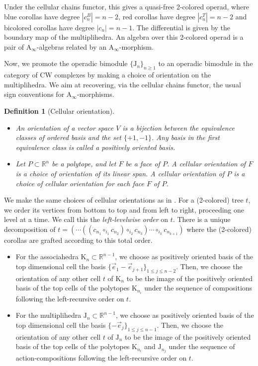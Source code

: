 \documentclass[twoside, 12pt]{amsart}
\newtheorem{definition}{Definition}[section]
\theoremstyle{remark}
\newcommand{\RR}{\mathbb{R}}
\newcommand{\K}{\mathrm{K}}
\newcommand{\J}{\mathrm{J}}
\begin{document}
Under the cellular chains functor, this gives a quasi-free 2-colored operad, where blue corollas have degree $|c_n^B|=n-2$, red corollas have degree $|c_n^T|=n-2$ and bicolored corollas have degree $|c_n|=n-1$. The differential is given by the boundary map of the multiplihedra. An algebra over this 2-colored operad is a pair of $\mathrm{A}_\infty$-algebras related by an $\mathrm{A}_\infty$-morphism. 

Now, we promote the operadic bimodule $\{\J_n\}_{n\geq 1}$ to an operadic bimodule in the category of CW complexes by making a choice of orientation on the multiplihedra. We aim at recovering, via the cellular chains functor, the usual sign conventions for $\mathrm{A}_\infty$-morphisms.

\begin{definition}[Cellular orientation] 
\leavevmode
\begin{itemize}
\item An \emph{orientation} of a vector space $V$ is a bijection between the equivalence classes of ordered basis and the set $\{+1,-1\}$. Any basis in the first equivalence class is called a \emph{positively oriented basis}.
\item Let $P\subset\RR^n$ be a polytope, and let $F$ be a face of $P$. A \emph{cellular orientation of $F$} is a choice of orientation of its linear span. A \emph{cellular orientation of $P$} is a choice of cellular orientation for each face $F$ of $P$. 
\end{itemize}
\end{definition}

We make the same choices of cellular orientations as in \cite[I, Section 4]{Mazuir21}. For a (2-colored) tree $t$, we order its vertices from bottom to top and from left to right, proceeding one level at a time. We call this the \emph{left-levelwise order} on $t$. There is a unique decomposition of $t=(\cdots ((c_{n_1} \circ_{i_1} c_{n_2})\circ_{i_2}c_{n_3})\cdots \circ_{i_k} c_{n_{k+1}})$ where the (2-colored) corollas are grafted according to this total order. 
\begin{itemize}
  \item For the associahedra $\K_n \subset \RR^{n-1}$, we choose as positively oriented basis of the top dimensional cell the basis $\{\vec e_1 - \vec e_{j+1}\}_{1\leq j \leq n-2}$. Then, we choose the orientation of any other cell $t$ of $\K_n$ to be the image of the positively oriented basis of the top cells of the polytopes $\K_{n_i}$ under the sequence of compositions following the left-recursive order on $t$. 
  \item For the multiplihedra $\J_n \subset \RR^{n-1}$, we choose as positively oriented basis of the top dimensional cell the basis $\{-\vec e_j\}_{1\leq j \leq n-1}$. Then, we choose the orientation of any other cell $t$ of $\J_n$ to be the image of the positively oriented basis of the top cells of the polytopes $\K_{n_i}$ and $\J_{n_j}$ under the sequence of action-compositions following the left-recursive order on $t$.
\end{itemize}
\end{document}
